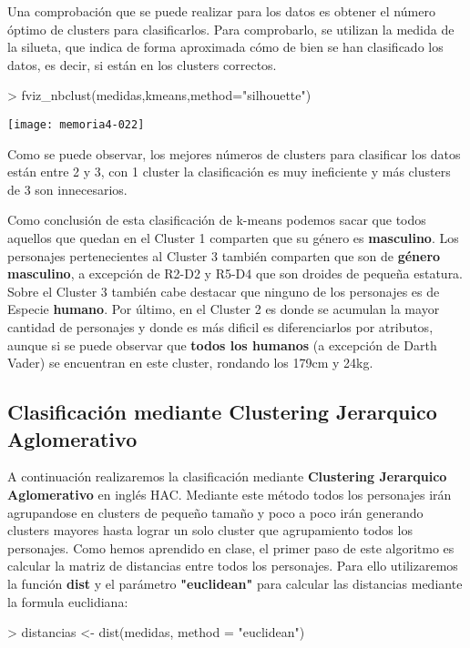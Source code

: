 \documentclass [a4paper] {article}
\begin{document}
Una comprobación que se puede realizar para los datos es obtener el número óptimo de clusters para clasificarlos.
Para comprobarlo, se utilizan la medida de la silueta, que indica de forma aproximada cómo de bien se han clasificado
los datos, es decir, si están en los clusters correctos. 

\begin{Schunk}
\begin{Sinput}
> fviz_nbclust(medidas,kmeans,method="silhouette")
\end{Sinput}
\end{Schunk}
\texttt{[image: memoria4-022]}

Como se puede observar, los mejores números de clusters para clasificar los datos están entre 2 y 3, con 1 cluster 
la clasificación es muy ineficiente y más clusters de 3 son innecesarios.

Como conclusión de esta clasificación de k-means podemos sacar que todos aquellos que quedan en el Cluster 1 comparten que su género
es \textbf{masculino}. Los personajes pertenecientes al Cluster 3 también comparten que son de \textbf{género masculino}, a excepción de R2-D2
y R5-D4 que son droides de pequeña estatura. Sobre el Cluster 3 también cabe destacar que ninguno de los personajes es de Especie \textbf{humano}.
Por último, en el Cluster 2 es donde se acumulan la mayor cantidad de personajes y donde es más dificil es diferenciarlos por atributos, aunque
si se puede observar que \textbf{todos los humanos} (a excepción de Darth Vader) se encuentran en este cluster, rondando los 179cm y 24kg.

\subsection{Clasificación mediante Clustering Jerarquico Aglomerativo}

A continuación realizaremos la clasificación mediante \textbf{Clustering Jerarquico Aglomerativo} en inglés HAC. Mediante este método todos los
personajes irán agrupandose en clusters de pequeño tamaño y poco a poco irán generando clusters mayores hasta lograr un solo cluster que agrupamiento
todos los personajes.
Como hemos aprendido en clase, el primer paso de este algoritmo es calcular la matriz de distancias entre todos los personajes. Para ello
utilizaremos la función \textbf{dist} y el parámetro \textbf{"euclidean"} para calcular las distancias mediante la formula euclidiana:

\begin{Schunk}
\begin{Sinput}
> distancias <- dist(medidas, method = "euclidean")
\end{Sinput}
\end{Schunk}
\end{document}
